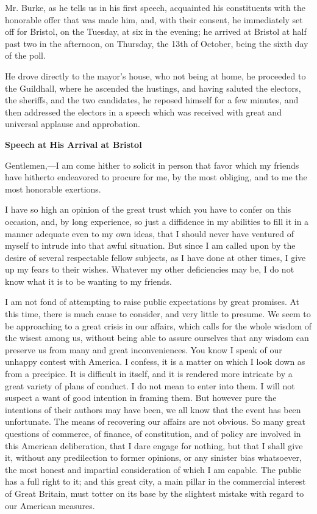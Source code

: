 Mr. Burke, as he tells us in his first speech, acquainted his constituents with the honorable offer that was made him, and, with their consent, he immediately set off for Bristol, on the Tuesday, at six in the evening; he arrived at Bristol at half past two in the afternoon, on Thursday, the 13th of October, being the sixth day of the poll.

He drove directly to the mayor's house, who not being at home, he proceeded to the Guildhall, where he ascended the hustings, and having saluted the electors, the sheriffs, and the two candidates, he reposed himself for a few minutes, and then addressed the electors in a speech which was received with great and universal applause and approbation.

\begin{center}
  \textbf{\large Speech at His Arrival at Bristol} \par 
\end{center}

Gentlemen,—I am come hither to solicit in person that favor which my friends have hitherto endeavored to procure for me, by the most obliging, and to me the most honorable exertions.

I have so high an opinion of the great trust which you have to confer on this occasion, and, by long experience, so just a diffidence in my abilities to fill it in a manner adequate even to my own ideas, that I should never have ventured of myself to intrude into that awful situation. But since I am called upon by the desire of several respectable fellow subjects, as I have done at other times, I give up my fears to their wishes. Whatever my other deficiencies may be, I do not know what it is to be wanting to my friends.

I am not fond of attempting to raise public expectations by great promises. At this time, there is much cause to consider, and very little to presume. We seem to be approaching to a great crisis in our affairs, which calls for the whole wisdom of the wisest among us, without being able to assure ourselves that any wisdom can preserve us from many and great inconveniences. You know I speak of our unhappy contest with America. I confess, it is a matter on which I look down as from a precipice. It is difficult in itself, and it is rendered more intricate by a great variety of plans of conduct. I do not mean to enter into them. I will not suspect a want of good intention in framing them. But however pure the intentions of their authors may have been, we all know that the event has been unfortunate. The means of recovering our affairs are not obvious. So many great questions of commerce, of finance, of constitution, and of policy are involved in this American deliberation, that I dare engage for nothing, but that I shall give it, without any predilection to former opinions, or any sinister bias whatsoever, the most honest and impartial consideration of which I am capable. The public has a full right to it; and this great city, a main pillar in the commercial interest of Great Britain, must totter on its base by the slightest mistake with regard to our American measures.

